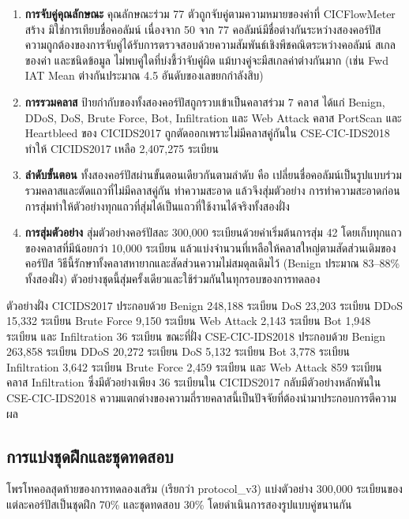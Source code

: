 \begin{enumerate}
    \item \textbf{การจับคู่คุณลักษณะ} คุณลักษณะร่วม 77 ตัวถูกจับคู่ตามความหมายของค่าที่ CICFlowMeter สร้าง มิใช่การเทียบชื่อคอลัมน์ เนื่องจาก 50 จาก 77 คอลัมน์มีชื่อต่างกันระหว่างสองคอร์ปัส ความถูกต้องของการจับคู่ได้รับการตรวจสอบด้วยความสัมพันธ์เชิงพีชคณิตระหว่างคอลัมน์ สเกลของค่า และชนิดข้อมูล ไม่พบคู่ใดที่บ่งชี้ว่าจับคู่ผิด แม้บางคู่จะมีสเกลค่าต่างกันมาก (เช่น Fwd IAT Mean ต่างกันประมาณ 4.5 อันดับของเลขยกกำลังสิบ)
    \item \textbf{การรวมคลาส} ป้ายกำกับของทั้งสองคอร์ปัสถูกรวบเข้าเป็นคลาสร่วม 7 คลาส ได้แก่ Benign, DDoS, DoS, Brute Force, Bot, Infiltration และ Web Attack คลาส PortScan และ Heartbleed ของ CICIDS2017 ถูกตัดออกเพราะไม่มีคลาสคู่กันใน CSE-CIC-IDS2018 ทำให้ CICIDS2017 เหลือ 2,407,275 ระเบียน
    \item \textbf{ลำดับขั้นตอน} ทั้งสองคอร์ปัสผ่านขั้นตอนเดียวกันตามลำดับ คือ เปลี่ยนชื่อคอลัมน์เป็นรูปแบบร่วม รวมคลาสและตัดแถวที่ไม่มีคลาสคู่กัน ทำความสะอาด แล้วจึงสุ่มตัวอย่าง การทำความสะอาดก่อนการสุ่มทำให้ตัวอย่างทุกแถวที่สุ่มได้เป็นแถวที่ใช้งานได้จริงทั้งสองฝั่ง
    \item \textbf{การสุ่มตัวอย่าง} สุ่มตัวอย่างคอร์ปัสละ 300,000 ระเบียนด้วยค่าเริ่มต้นการสุ่ม 42 โดยเก็บทุกแถวของคลาสที่มีน้อยกว่า 10,000 ระเบียน แล้วแบ่งจำนวนที่เหลือให้คลาสใหญ่ตามสัดส่วนเดิมของคอร์ปัส วิธีนี้รักษาทั้งคลาสหายากและสัดส่วนความไม่สมดุลเดิมไว้ (Benign ประมาณ 83--88\% ทั้งสองฝั่ง) ตัวอย่างชุดนี้สุ่มครั้งเดียวและใช้ร่วมกันในทุกรอบของการทดลอง
\end{enumerate}

ตัวอย่างฝั่ง CICIDS2017 ประกอบด้วย Benign 248,188 ระเบียน DoS 23,203 ระเบียน DDoS 15,332 ระเบียน Brute Force 9,150 ระเบียน Web Attack 2,143 ระเบียน Bot 1,948 ระเบียน และ Infiltration 36 ระเบียน ขณะที่ฝั่ง CSE-CIC-IDS2018 ประกอบด้วย Benign 263,858 ระเบียน DDoS 20,272 ระเบียน DoS 5,132 ระเบียน Bot 3,778 ระเบียน Infiltration 3,642 ระเบียน Brute Force 2,459 ระเบียน และ Web Attack 859 ระเบียน คลาส Infiltration ซึ่งมีตัวอย่างเพียง 36 ระเบียนใน CICIDS2017 กลับมีตัวอย่างหลักพันใน CSE-CIC-IDS2018 ความแตกต่างของความถี่รายคลาสนี้เป็นปัจจัยที่ต้องนำมาประกอบการตีความผล

\subsection{การแบ่งชุดฝึกและชุดทดสอบ}
\label{sec:cd-split}

โพรโทคอลสุดท้ายของการทดลองเสริม (เรียกว่า protocol\_v3) แบ่งตัวอย่าง 300,000 ระเบียนของแต่ละคอร์ปัสเป็นชุดฝึก 70\% และชุดทดสอบ 30\% โดยดำเนินการสองรูปแบบคู่ขนานกัน

